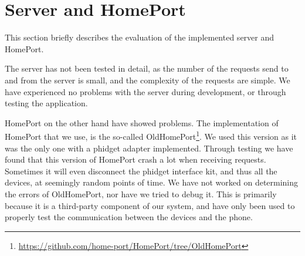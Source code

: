 \section{Server and HomePort}\label{sec:servereval}
This section briefly describes the evaluation of the implemented server and HomePort. 

The server has not been tested in detail, 
as the number of the requests send to and from the server is small,
and the complexity of the requests are simple. 
We have experienced no problems with the server during development,
or through testing the application. 

HomePort on the other hand have showed problems. 
The implementation of HomePort that we use, 
is the so-called OldHomePort\footnote{\url{https://github.com/home-port/HomePort/tree/OldHomePort}}. 
We used this version as it was the only one with a phidget adapter implemented. 
Through testing we have found that this version of HomePort crash a lot when receiving requests. 
Sometimes it will even disconnect the phidget interface kit, 
and thus all the devices, at seemingly random points of time. 
We have not worked on determining the errors of OldHomePort, 
nor have we tried to debug it. 
This is primarily because it is a third-party component of our system, 
and have only been used to properly test the communication between the devices and the phone. 